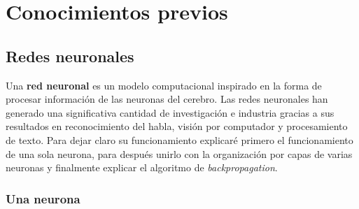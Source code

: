 \documentclass[12,twoside]{TFG-GM}
\theoremstyle{definition}
\theoremstyle{remark}
\begin{document}


\maketitle

\tableofcontents
\newpage
\section{Conocimientos previos}
%
%


\subsection{Redes neuronales}
Una \textbf{red neuronal} es un modelo computacional inspirado en la forma de procesar información de las neuronas del cerebro. Las redes neuronales han generado una significativa cantidad de investigación e industria gracias a sus resultados en reconocimiento del habla, visión por computador y procesamiento de texto. Para dejar claro su funcionamiento explicaré primero el funcionamiento de una sola neurona, para después unirlo con la organización por capas de varias neuronas y finalmente explicar el algoritmo de \textit{backpropagation}. 

\subsubsection{Una neurona}
\end{document}
